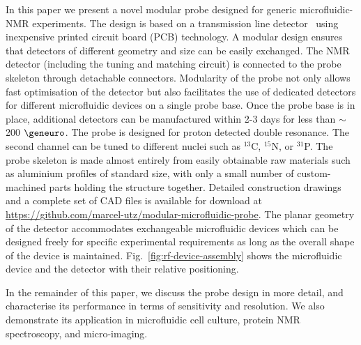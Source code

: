 \documentclass[preprint,5p]{elsarticle}
\newcommand{\fig}[1]{Fig.~\ref{#1}}
\begin{document}
In this paper we present a novel modular probe designed for generic
microfluidic-NMR experiments. The design is based on a transmission line
detector~\cite{stripline_jan,gream_2016} using inexpensive
printed circuit board (PCB) technology. A modular design ensures that detectors of
different geometry and size can be easily exchanged.
The NMR detector (including the tuning and matching circuit) is connected to the probe
skeleton through detachable connectors. Modularity of the probe not only allows
fast optimisation of the detector but also facilitates the use of dedicated detectors
for different microfluidic devices on a single probe base.
Once the probe base is in place, additional detectors can be manufactured
within 2-3 days for less than $\sim$200 $\geneuro$.
The probe is designed for proton detected double resonance.
The second channel can be tuned to different nuclei such as $^{13}$C, $^{15}$N, or
$^{31}$P. The probe skeleton is made almost entirely from easily obtainable raw materials
such as aluminium profiles of standard size, with only a small number of
custom-machined parts holding the structure together.
Detailed construction drawings and a complete set of CAD files is
available for download at \url{https://github.com/marcel-utz/modular-microfluidic-probe}.
The planar geometry of the detector accommodates exchangeable microfluidic devices
which can be designed freely for specific experimental requirements as long as the
overall shape of the device is maintained. \fig{fig:rf-device-assembly} shows the microfluidic device and the detector with their relative positioning.

In the remainder of this paper, we discuss the probe design in more detail,
and characterise its performance in terms of sensitivity and resolution.
We also demonstrate its application in microfluidic cell culture,
protein NMR spectroscopy, and micro-imaging.
\end{document}
